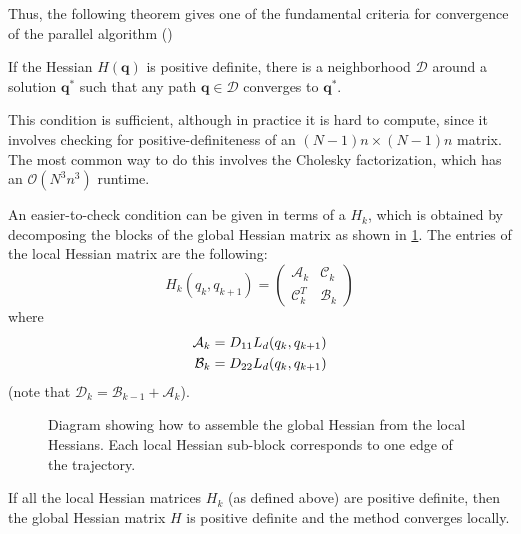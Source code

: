 Thus, the following theorem gives one of the fundamental criteria for convergence of the parallel algorithm (\cite[Prop. 4.3, 4.5, remark 4.6]{ferraroParallelIterativeMethod2025})
\begin{theorem}\label{thm:hessian-pd-convergence}
	If the Hessian $H(\mathbf{q})$ is positive definite, there is a neighborhood $\mathcal{D}$ around a solution $\mathbf{q}^*$ such that any path $\mathbf{q} \in \mathcal{D}$ converges to $\mathbf{q}^*$.
\end{theorem}

This condition is sufficient, although in practice it is hard to compute, since it involves checking for positive-definiteness of an $(N-1)n \times (N-1)n$ matrix. The most common way to do this involves the Cholesky factorization, which has an $\mathcal{O}(N^3 n^3)$ runtime.

An easier-to-check condition can be given in terms of a  $H_k$, which is obtained by decomposing the blocks of the global Hessian matrix as shown in \cref{fig:hessian-assembly}. The entries of the local Hessian matrix are the following:
\begin{equation}
	H_k(q_k, q_{k+1}) = \begin{pmatrix}
		\mathcal{A}_k   & \mathcal{C}_k \\
		\mathcal{C}_k^T & \mathcal{B}_k
	\end{pmatrix}
\end{equation}
where
\begin{equation}
	\begin{aligned}
		\mathcal{A}_k & = D_{11} L_d(q_k, q_{k+1}) \\
		\mathcal{B}_k & = D_{22} L_d(q_k, q_{k+1}) \\
	\end{aligned}
	\label{eq:hessian-terms-2}
\end{equation}
(note that $\mathcal{D}_k = \mathcal{B}_{k-1} + \mathcal{A}_k$).

\begin{figure}[ht]
	\centering
	
	\caption{Diagram showing how to assemble the global Hessian from the local Hessians. Each local Hessian sub-block corresponds to one edge of the trajectory.}\label{fig:hessian-assembly}
\end{figure}

\begin{theorem}\label{thm:local-hessian-pd-convergence}
	If all the local Hessian matrices $H_k$ (as defined above) are positive definite, then the global Hessian matrix $H$ is positive definite and the method converges locally.
\end{theorem}

